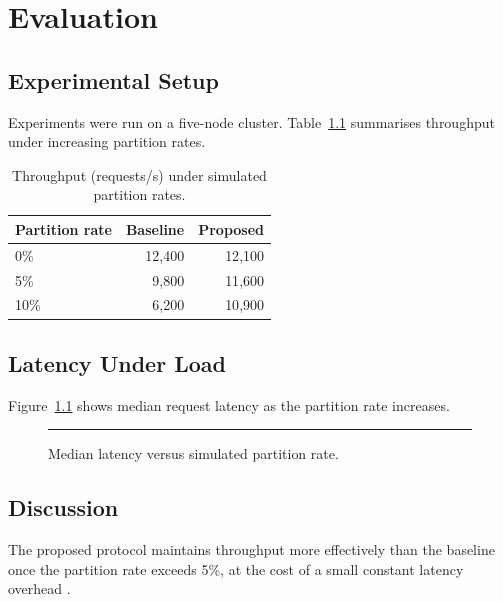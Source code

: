 \chapter{Evaluation}
\label{ch:evaluation}

\section{Experimental Setup}

Experiments were run on a five-node cluster. Table~\ref{tab:results}
summarises throughput under increasing partition rates.

\begin{table}[htbp]
  \centering
  \caption{Throughput (requests/s) under simulated partition rates.}
  \label{tab:results}
  \begin{tabular}{@{}lrr@{}}
    \toprule
    Partition rate & Baseline & Proposed \\
    \midrule
    0\%  & 12{,}400 & 12{,}100 \\
    5\%  & 9{,}800  & 11{,}600 \\
    10\% & 6{,}200  & 10{,}900 \\
    \bottomrule
  \end{tabular}
\end{table}

\section{Latency Under Load}

Figure~\ref{fig:latency} shows median request latency as the partition
rate increases.

\begin{figure}[htbp]
  \centering
  \rule{0.6\textwidth}{4cm}
  \caption{Median latency versus simulated partition rate.}
  \label{fig:latency}
\end{figure}

\section{Discussion}

The proposed protocol maintains throughput more effectively than the
baseline once the partition rate exceeds 5\%, at the cost of a small
constant latency overhead \citep{ongaro2014search}.
